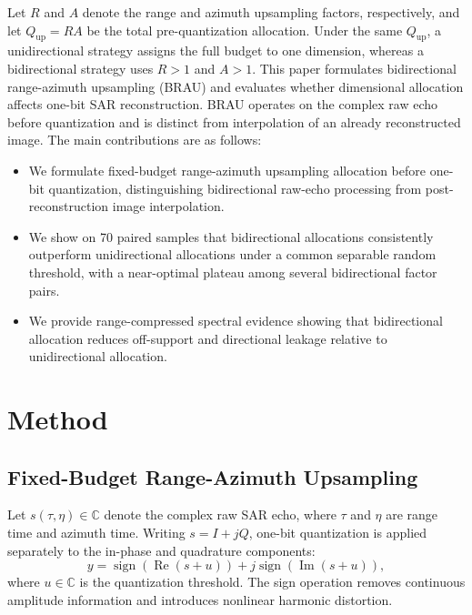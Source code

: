 \documentclass[conference]{IEEEtran}
\begin{document}
Let $R$ and $A$ denote the range and azimuth upsampling factors, respectively, and let $Q_{\mathrm{up}}=R A$ be the total pre-quantization allocation. Under the same $Q_{\mathrm{up}}$, a unidirectional strategy assigns the full budget to one dimension, whereas a bidirectional strategy uses $R>1$ and $A>1$. This paper formulates bidirectional range-azimuth upsampling (BRAU) and evaluates whether dimensional allocation affects one-bit SAR reconstruction. BRAU operates on the complex raw echo before quantization and is distinct from interpolation of an already reconstructed image. The main contributions are as follows:
\begin{itemize}
    \item We formulate fixed-budget range-azimuth upsampling allocation before one-bit quantization, distinguishing bidirectional raw-echo processing from post-reconstruction image interpolation.
    \item We show on 70 paired samples that bidirectional allocations consistently outperform unidirectional allocations under a common separable random threshold, with a near-optimal plateau among several bidirectional factor pairs.
    \item We provide range-compressed spectral evidence showing that bidirectional allocation reduces off-support and directional leakage relative to unidirectional allocation.
\end{itemize}

\section{Method}

\subsection{Fixed-Budget Range-Azimuth Upsampling}

Let $s(\tau,\eta)\in\mathbb{C}$ denote the complex raw SAR echo, where $\tau$ and $\eta$ are range time and azimuth time. Writing $s=I+jQ$, one-bit quantization is applied separately to the in-phase and quadrature components:
\begin{equation}
    y=\operatorname{sign}\!\left(\operatorname{Re}(s+u)\right)
    +j\operatorname{sign}\!\left(\operatorname{Im}(s+u)\right),
\end{equation}
where $u\in\mathbb{C}$ is the quantization threshold. The sign operation removes continuous amplitude information and introduces nonlinear harmonic distortion.
\end{document}
